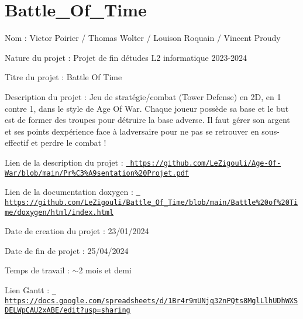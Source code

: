 \chapter{Battle\+\_\+\+Of\+\_\+\+Time}
\hypertarget{md__2info_2etu_2l2info_2s2205576_2Documents_2Projet_2Battle__Of__Time_2README}{}\label{md__2info_2etu_2l2info_2s2205576_2Documents_2Projet_2Battle__Of__Time_2README}
\label{md__2info_2etu_2l2info_2s2205576_2Documents_2Projet_2Battle__Of__Time_2README_autotoc_md0}%
%
 Nom \+: Victor Poirier / Thomas Wolter / Louison Roquain / Vincent Proudy

Nature du projet \+: Projet de fin d\textquotesingle{}études L2 informatique 2023-\/2024

Titre du projet \+: Battle Of Time

Description du projet \+: Jeu de stratégie/combat (Tower Defense) en 2D, en 1 contre 1, dans le style de Age Of War. Chaque joueur possède sa base et le but est de former des troupes pour détruire la base adverse. Il faut gérer son argent et ses points d\textquotesingle{}expérience face à l\textquotesingle{}adversaire pour ne pas se retrouver en sous-\/effectif et perdre le combat !

Lien de la description du projet \+: \href{https://github.com/LeZigouli/Age-Of-War/blob/main/Pr\%C3\%A9sentation\%20Projet.pdf}{\texttt{ https\+://github.\+com/\+Le\+Zigouli/\+Age-\/\+Of-\/\+War/blob/main/\+Pr\%\+C3\%\+A9sentation\%20\+Projet.\+pdf}}

Lien de la documentation doxygen \+: \href{https://github.com/LeZigouli/Battle_Of_Time/blob/main/Battle\%20of\%20Time/doxygen/html/index.html}{\texttt{ https\+://github.\+com/\+Le\+Zigouli/\+Battle\+\_\+\+Of\+\_\+\+Time/blob/main/\+Battle\%20of\%20\+Time/doxygen/html/index.\+html}}

Date de creation du projet \+: 23/01/2024

Date de fin de projet \+: 25/04/2024

Temps de travail \+: \texorpdfstring{$\sim$}{\string~}2 mois et demi

Lien Gantt \+: \href{https://docs.google.com/spreadsheets/d/1Br4r9mUNjq32nPQts8MglLlhUDhWXSDELWpCAU2xABE/edit?usp=sharing}{\texttt{ https\+://docs.\+google.\+com/spreadsheets/d/1\+Br4r9m\+UNjq32n\+PQts8\+Mgl\+Llh\+UDh\+WXSDELWp\+CAU2x\+ABE/edit?usp=sharing}} 